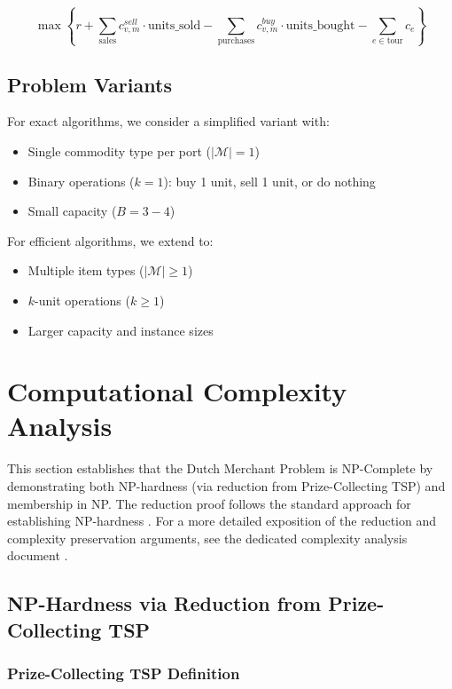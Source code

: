 \documentclass[12pt]{article}
\begin{document}
$$\max \left\{ r + \sum_{\text{sales}} c_{v,m}^{sell} \cdot \text{units\_sold} - \sum_{\text{purchases}} c_{v,m}^{buy} \cdot \text{units\_bought} - \sum_{e \in \text{tour}} c_e \right\}$$

\subsection{Problem Variants}

For exact algorithms, we consider a simplified variant with:
\begin{itemize}
    \item Single commodity type per port ($|\mathcal{M}| = 1$)
    \item Binary operations ($k = 1$): buy 1 unit, sell 1 unit, or do nothing
    \item Small capacity ($B = 3-4$)
\end{itemize}

For efficient algorithms, we extend to:
\begin{itemize}
    \item Multiple item types ($|\mathcal{M}| \geq 1$)
    \item $k$-unit operations ($k \geq 1$)
    \item Larger capacity and instance sizes
\end{itemize}

\section{Computational Complexity Analysis}
\label{sec:complexity}

This section establishes that the Dutch Merchant Problem is NP-Complete by demonstrating both NP-hardness (via reduction from Prize-Collecting TSP) and membership in NP. The reduction proof follows the standard approach for establishing NP-hardness \cite{garey1979}. For a more detailed exposition of the reduction and complexity preservation arguments, see the dedicated complexity analysis document \cite{reduction2025}.

\subsection{NP-Hardness via Reduction from Prize-Collecting TSP}

\subsubsection{Prize-Collecting TSP Definition}
\end{document}
